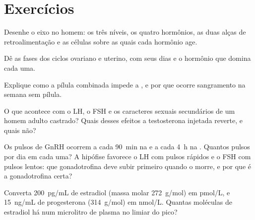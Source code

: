 \section{Exercícios}

\begin{exercise}[$\star$]\label{exo:b2:reproductive-hormones:1}
Desenhe o eixo no homem: os três níveis, os quatro hormônios, as duas
alças de retroalimentação e as células sobre as quais cada hormônio
age.
\end{exercise}

\begin{exercise}[$\star$]\label{exo:b2:reproductive-hormones:2}
Dê as fases dos ciclos ovariano e uterino, com seus dias e o hormônio
que domina cada uma.
\end{exercise}

\begin{exercise}[$\star$]\label{exo:b2:reproductive-hormones:3}
Explique como a pílula combinada impede a , e por que ocorre
sangramento na semana sem pílula.
\end{exercise}

\begin{exercise}[$\star$]\label{exo:b2:reproductive-hormones:4}
O que acontece com o LH, o FSH e os caracteres sexuais secundários de
um homem adulto castrado? Quais desses efeitos a testosterona injetada
reverte, e quais não?
\end{exercise}

\begin{exercise}[$\star\star$]\label{exo:b2:reproductive-hormones:5}
Os pulsos de GnRH ocorrem a cada \qty{90}{min} na  e a
cada \qty{4}{h} na . Quantos pulsos por dia em cada uma? A
hipófise favorece o LH com pulsos rápidos e o FSH com pulsos lentos:
que gonadotrofina deve subir primeiro quando o  morre, e
por que é a gonadotrofina certa?
\end{exercise}

\begin{exercise}[$\star\star$]\label{exo:b2:reproductive-hormones:6}
Converta \qty{200}{pg/mL} de estradiol (massa molar
\qty{272}{g/mol}) em \unit{pmol/L}, e \qty{15}{ng/mL} de
progesterona (\qty{314}{g/mol}) em \unit{nmol/L}. Quantas moléculas
de estradiol há num microlitro de plasma no limiar do pico?
\end{exercise}


